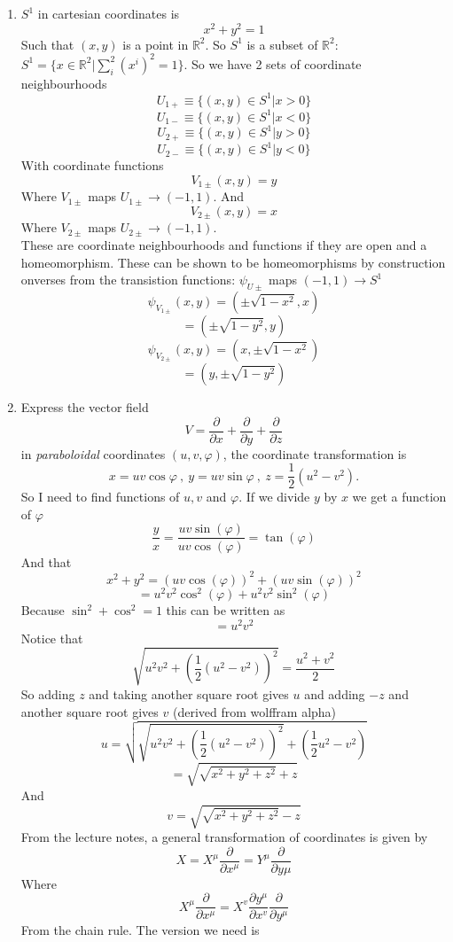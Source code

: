 \documentclass[12pt]{article}
\newcommand{\half}{\frac{1}{2}}
\begin{document}
\begin{enumerate}
\item $S^1$ in cartesian coordinates is 
$$ x^2 + y^2 =1 $$
Such that $(x,y)$ is a point in $\mathbb{R}^2$. So $S^1$ is a subset of $\mathbb{R}^2$: $S^1 = \{ x \in \mathbb{R}^2 | \sum_i^2 (x^i)^2 =1 \} $. 
So we have 2 sets of coordinate neighbourhoods 
$$ U_{1+} \equiv \{ (x,y) \in S^1 | x > 0 \} $$
$$ U_{1-} \equiv \{ (x,y) \in S^1 | x < 0 \} $$
$$ U_{2+} \equiv \{ (x,y) \in S^1 | y > 0 \} $$
$$ U_{2-} \equiv \{ (x,y) \in S^1 | y < 0 \} $$
With coordinate functions 
$$ V_{1 \pm} (x,y) =y $$
Where $V_{1 \pm}$ maps $U_{1 \pm} \rightarrow (-1,1)$. And 
$$ V_{2 \pm} (x,y) = x $$
Where $V_{2 \pm}$ maps $U_{2 \pm} \rightarrow (-1,1)$. 
\\
These are coordinate neighbourhoods and functions if they are open and a homeomorphism. These can be shown to be homeomorphisms by construction onverses from the transistion functions: 
$ \psi_{U \pm}$ maps $(-1,1) \rightarrow S^1$ 
$$ \psi_{V_{1 \pm}} (x,y) = ( \pm \sqrt{1-x^2}, x) $$
$$ = (\pm \sqrt{1-y^2}, y) $$
$$ \psi_{V_{2 \pm}} (x,y) = (x,\pm \sqrt{1-x^2}) $$
$$ = (y, \pm \sqrt{1-y^2}) $$
\item Express the vector field
$$
V = \frac{\partial}{\partial x} +  \frac{\partial}{\partial y} +  \frac{\partial}{\partial z}
$$
in {\em paraboloidal} coordinates $(u,v,\varphi)$, the coordinate transformation is
$$
x = uv\cos \varphi \ , \ y = uv \sin \varphi \ , \ z = \half (u^2 - v^2 ) .
$$
So I need to find functions of $u, v$ and $\varphi$. If we divide $y$ by $x$ we get a function of $\varphi$
$$ \frac{y}{x} = \frac{uv \sin(\varphi)}{uv \cos(\varphi)} = \tan(\varphi) $$
And that 
$$ x^2 + y^2 = (uv \cos(\varphi))^2 + (uv \sin(\varphi))^2 $$
$$ = u^2 v^2 \cos^2 (\varphi) + u^2 v^2 \sin^2 (\varphi) $$
Because $\sin^2 + \cos^2 =1$ this can be written as
$$ = u^2 v^2 $$
Notice that 
$$ \sqrt{u^2 v^2 + (\frac{1}{2} (u^2 - v^2) )^2} = \frac{u^2 +v^2}{2} $$
So adding $z$ and taking another square root gives $u$ and adding $-z$ and another square root gives $v$ (derived from wolffram alpha) 
$$ u = \sqrt{\sqrt{u^2 v^2 + (\frac{1}{2} (u^2 - v^2))^2 }+ (\frac{1}{2} u^2 - v^2)} $$
$$ = \sqrt{\sqrt{x^2 + y^2 + z^2 } + z} $$
And 
$$ v = \sqrt{\sqrt{x^2 + y^2 + z^2 }-z} $$
From the lecture notes, a general transformation of coordinates is given by 
$$ X = X^{\mu} \frac{\partial}{\partial x^{\mu}} = Y^{\mu} \frac{\partial}{\partial y{\mu}} $$
Where 
$$ X^{\mu} \frac{\partial}{\partial x^{\mu}} = X^{v} \frac{\partial y^{\mu} }{\partial x^{v}} \frac{\partial}{\partial y^{\mu}} $$
From the chain rule. The version we need is 

\end{enumerate}
\end{document}

